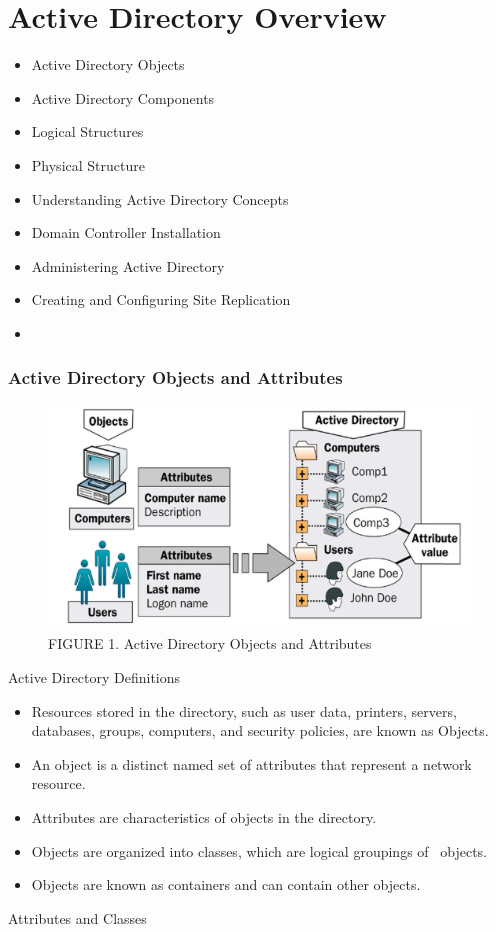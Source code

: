 \chapter{Active Directory Overview}

\begin{itemize}
    \item Active Directory Objects
    \item Active Directory Components
    \item Logical Structures
    \item Physical Structure
    \item Understanding Active Directory Concepts
    \item Domain Controller Installation
    \item Administering Active Directory
    \item Creating and Configuring Site Replication
    \item 

\end{itemize}

\subsection{Active Directory Objects and Attributes}

\begin{figure}
    \centering
    \includegraphics[width=1\linewidth]{adobj.png}
    \caption{FIGURE 1. Active Directory Objects and Attributes}
    \label{fig:placeholder}
\end{figure}

Active Directory Definitions

\begin{itemize}
    \item Resources stored in the directory, such as user data, printers, servers, databases, groups, computers, and security policies, are known as Objects.
    \item An object is a distinct named set of attributes that represent a network resource.
    \item Attributes are characteristics of objects in the directory.
    \item Objects are organized into classes, which are logical groupings of  objects.
    \item Objects are known as containers and can contain other objects.
\end{itemize}
Attributes and Classes

